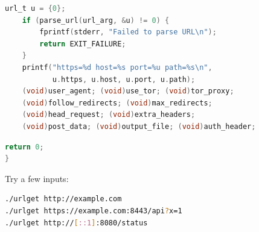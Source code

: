 \begin{lstlisting}[style=newcode,language=C,firstnumber=last]
    url_t u = {0};
    if (parse_url(url_arg, &u) != 0) {
        fprintf(stderr, "Failed to parse URL\n");
        return EXIT_FAILURE;
    }
    printf("https=%d host=%s port=%u path=%s\n",
           u.https, u.host, u.port, u.path);
    (void)user_agent; (void)use_tor; (void)tor_proxy;
    (void)follow_redirects; (void)max_redirects;
    (void)head_request; (void)extra_headers;
    (void)post_data; (void)output_file; (void)auth_header;
\end{lstlisting}
\begin{lstlisting}[style=oldcode,language=C,firstnumber=last]
    return 0;
}
\end{lstlisting}
\FullSourceStop

Try a few inputs:

\begin{lstlisting}[style=snippet,language=bash]
./urlget http://example.com
./urlget https://example.com:8443/api?x=1
./urlget http://[::1]:8080/status
\end{lstlisting}
